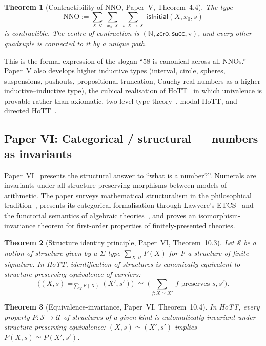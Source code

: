 \documentclass[12pt]{article}
\newtheorem{theorem}{Theorem}[section]
\theoremstyle{definition}
\theoremstyle{remark}
\newcommand{\N}{\mathbb{N}}
\newcommand{\U}{\mathcal{U}}
\newcommand{\zero}{\mathsf{zero}}
\newcommand{\suc}{\mathsf{succ}}
\newcommand{\eqv}{\simeq}
\newcommand{\NNO}{\mathrm{NNO}}
\begin{document}
\begin{theorem}[Contractibility of NNO, Paper~V, Theorem~4.4]
\label{thm:nno-contr}
The type
\[
\NNO := \sum_{X : \U}\;\sum_{x_0 : X}\;\sum_{s : X \to X}\;
\mathsf{isInitial}(X, x_0, s)
\]
is contractible. The centre of contraction is $(\N, \zero, \suc, \star)$,
and every other quadruple is connected to it by a unique path.
\end{theorem}

This is the formal expression of the slogan ``$58$ is canonical across all
NNOs.'' Paper~V also develops higher inductive types (interval, circle,
spheres, suspensions, pushouts, propositional truncation, Cauchy real
numbers as a higher inductive--inductive type), the cubical realisation of
HoTT~\cite{CCHM,CubicalAgda} in which univalence is provable rather than
axiomatic, two-level type theory~\cite{2LTT}, modal HoTT, and directed
HoTT~\cite{RiehlShulman}.

\subsection{Paper VI: Categorical / structural --- numbers as invariants}
\label{sec:row-vi}

Paper~VI~\cite{paper-vi} presents the structural answer to ``what is a
number?''. Numerals are invariants under all structure-preserving
morphisms between models of arithmetic. The paper surveys mathematical
structuralism in the philosophical
tradition~\cite{Resnik1997,Shapiro1997,Hellman1989,Awodey1996}, presents
its categorical formalisation through Lawvere's ETCS~\cite{Lawvere1964}
and the functorial semantics of algebraic theories~\cite{Lawvere1963},
and proves an isomorphism-invariance theorem for first-order properties
of finitely-presented theories.

\begin{theorem}[Structure identity principle, Paper~VI, Theorem~10.3]
\label{thm:sip}
Let $\mathcal{S}$ be a notion of structure given by a $\Sigma$-type
$\sum_{X : \U} F(X)$ for $F$ a structure of finite signature. In HoTT,
identification of structures is canonically equivalent to
structure-preserving equivalence of carriers:
\[
\bigl((X, s) =_{\sum_X F(X)} (X', s')\bigr) \;\eqv\;
\bigl(\sum_{f : X \eqv X'}\, f \text{ preserves } s, s'\bigr).
\]
\end{theorem}

\begin{theorem}[Equivalence-invariance, Paper~VI, Theorem~10.4]
\label{thm:eq-inv}
In HoTT, every property $P : \mathcal{S} \to \U$ of structures of a given
kind is automatically invariant under structure-preserving equivalence:
$(X, s) \eqv (X', s')$ implies $P(X, s) \eqv P(X', s')$.
\end{theorem}
\end{document}
